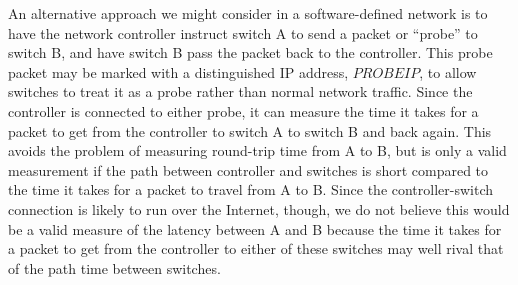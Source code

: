 \documentclass[pageno]{jpaper}
\begin{document}
An alternative approach we might consider in a software-defined network is to have the network controller 
instruct switch A to send a packet or ``probe'' to switch B, and have switch B pass the packet back 
to the controller. This probe packet may be marked with a distinguished IP address, $PROBEIP$, to allow
switches to treat it as a probe rather than normal network traffic. 
Since the controller is connected to either probe, it can measure the time it takes 
for a packet to get from the controller to switch A to switch B and back again.  This avoids the problem 
of measuring round-trip time from A to B, but is only a valid measurement if the path between controller 
and switches is short compared to the time it takes for a packet to travel from A to B. Since the 
controller-switch connection is likely to run over the Internet, though, we do not believe this would be 
a valid measure of the latency between A and B because the time it takes for a packet to get from the controller
to either of these switches may well rival that of the path time between switches.
\end{document}
